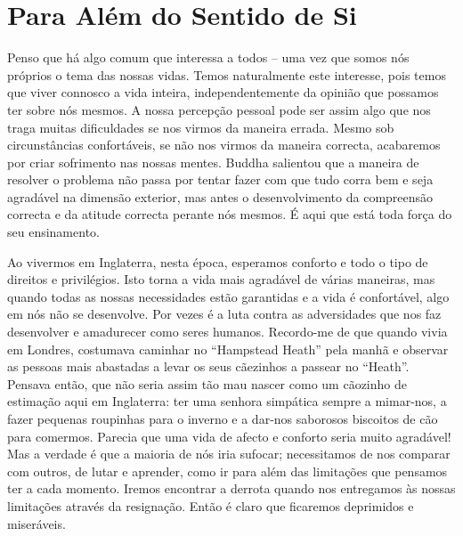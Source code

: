\chapter{Para Além do Sentido de Si}

Penso que há algo comum que interessa a todos -- uma vez que somos nós
próprios o tema das nossas vidas. Temos naturalmente este interesse,
pois temos que viver connosco a vida inteira, independentemente da
opinião que possamos ter sobre nós mesmos. A nossa percepção pessoal
pode ser assim algo que nos traga muitas dificuldades se nos virmos da
maneira errada. Mesmo sob circunstâncias confortáveis, se não nos virmos
da maneira correcta, acabaremos por criar sofrimento nas nossas mentes.
Buddha salientou que a maneira de resolver o problema não passa por
tentar fazer com que tudo corra bem e seja agradável na dimensão
exterior, mas antes o desenvolvimento da compreensão correcta e da
atitude correcta perante nós mesmos. É aqui que está toda força do seu
ensinamento.

Ao vivermos em Inglaterra, nesta época, esperamos conforto e todo o tipo
de direitos e privilégios. Isto torna a vida mais agradável de várias
maneiras, mas quando todas as nossas necessidades estão garantidas e a
vida é confortável, algo em nós não se desenvolve. Por vezes é a luta
contra as adversidades que nos faz desenvolver e amadurecer como seres
humanos. Recordo-me de que quando vivia em Londres, costumava caminhar
no ``Hampstead Heath'' pela manhã e observar as pessoas mais abastadas a
levar os seus cãezinhos a passear no ``Heath''. Pensava então, que não
seria assim tão mau nascer como um cãozinho de estimação aqui em
Inglaterra: ter uma senhora simpática sempre a mimar-nos, a fazer
pequenas roupinhas para o inverno e a dar-nos saborosos biscoitos de cão
para comermos. Parecia que uma vida de afecto e conforto seria muito
agradável! Mas a verdade é que a maioria de nós iria sufocar;
necessitamos de nos comparar com outros, de lutar e aprender, como ir
para além das limitações que pensamos ter a cada momento. Iremos
encontrar a derrota quando nos entregamos às nossas limitações através
da resignação. Então é claro que ficaremos deprimidos e miseráveis.

